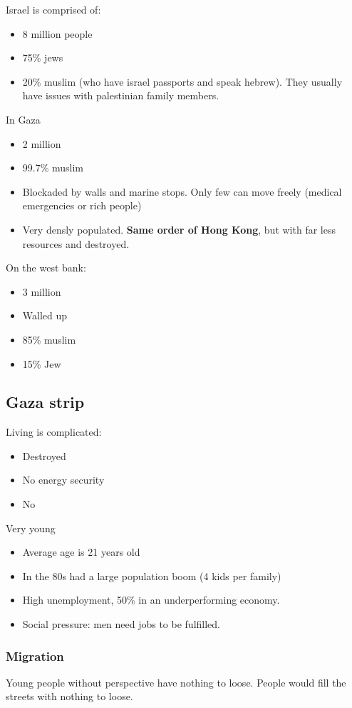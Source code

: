 Israel is comprised of:
\begin{itemize}
	\item 8 million people
	\item 75\% jews
	\item 20\% muslim (who have israel passports and speak hebrew). They usually have issues with palestinian family members.
\end{itemize}

In Gaza
\begin{itemize}
	\item 2 million
	\item 99.7\% muslim
	\item Blockaded by walls and marine stops. Only few can move freely (medical emergencies or rich people)
	\item Very densly populated. \textbf{Same order of Hong Kong}, but with far less resources and destroyed.
\end{itemize}


On the west bank:
\begin{itemize}
	\item 3 million
	\item Walled up
	\item 85\% muslim
	\item 15\% Jew 
\end{itemize}



\subsection{Gaza strip}

Living is complicated:
\begin{itemize}
	\item Destroyed
	\item No energy security
	\item No
\end{itemize}

Very young
\begin{itemize}
	\item Average age is 21 years old
	\item In the 80s had a large population boom (4 kids per family)
	\item High unemployment, 50\%  in an underperforming economy.
	\item Social pressure: men need jobs to be fulfilled.
\end{itemize}


\subsubsection{Migration}
Young people without perspective have nothing to loose.
People would fill the streets with nothing to loose.

